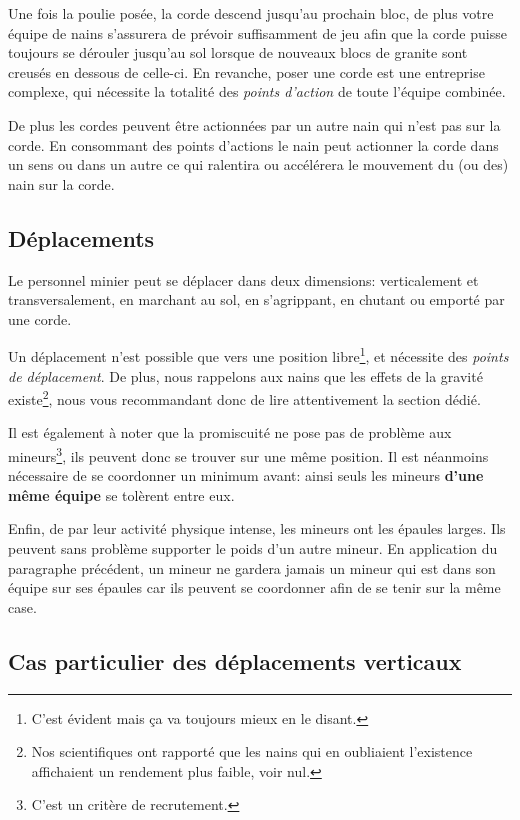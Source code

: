   Une fois la poulie posée, la corde descend jusqu'au prochain bloc, de plus
  votre équipe de nains s'assurera de prévoir suffisamment de jeu afin que la
  corde puisse toujours se dérouler jusqu'au sol lorsque de nouveaux blocs de
  granite sont creusés en dessous de celle-ci. En revanche, poser une corde est
  une entreprise complexe, qui nécessite la totalité des \textit{points
  d'action} de toute l'équipe combinée.

  De plus les cordes peuvent être actionnées par un autre nain qui n'est pas
  sur la corde. En consommant des points d'actions le nain peut actionner la
  corde dans un sens ou dans un autre ce qui ralentira ou accélérera le
  mouvement du (ou des) nain sur la corde.

\subsection{Déplacements}

  Le personnel minier peut se déplacer dans deux dimensions: verticalement et
  transversalement, en marchant au sol, en s'agrippant, en
  chutant ou emporté par une corde.

  Un déplacement n'est possible que vers une position libre\footnote{C'est
  évident mais ça va toujours mieux en le disant.}, et nécessite des
  \textit{points de déplacement}. De plus, nous rappelons aux nains que les
  effets de la gravité existe\footnote{Nos scientifiques ont rapporté que les
  nains qui en oubliaient l'existence affichaient un rendement plus faible,
  voir nul.}, nous vous recommandant donc de lire attentivement la section
  dédié.

  Il est également à noter que la promiscuité ne pose pas de problème aux
  mineurs\footnote{C'est un critère de recrutement.}, ils peuvent donc se
  trouver sur une même position. Il est néanmoins nécessaire de se coordonner
  un minimum avant: ainsi seuls les mineurs \textbf{d'une même équipe} se
  tolèrent entre eux.

  Enfin, de par leur activité physique intense, les mineurs ont les épaules
  larges. Ils peuvent sans problème supporter le poids d'un autre mineur. En
  application du paragraphe précédent, un mineur ne gardera jamais un mineur
  qui est dans son équipe sur ses épaules car ils peuvent se coordonner afin de
  se tenir sur la même case.

\subsection{Cas particulier des déplacements verticaux}

